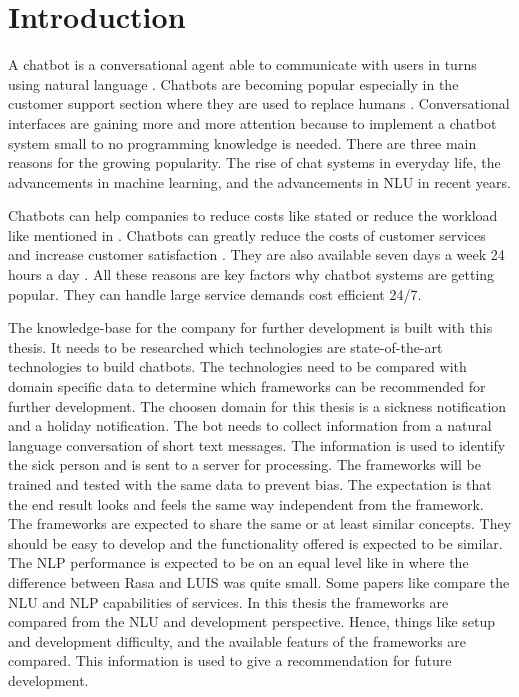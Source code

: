 
\section{Introduction} %
A chatbot is a conversational agent able to communicate with users in turns 
using natural language \cite{evaluateChatbotsShawar2007, shawar2007chatbots, huang2007extracting, gregori2017evaluation}.
Chatbots are becoming popular especially in the customer support section where they are used to replace humans \cite{GO2019304}.
Conversational interfaces are gaining more and more attention because to implement a chatbot system small 
to no programming knowledge is needed. \cite{braunEvaluatingNLU}
There are three main reasons for the growing popularity.
The rise of chat systems in everyday life, the advancements in machine learning, and the 
advancements in NLU in recent years. \cite{braunEvaluatingNLU}

Chatbots can help companies to reduce costs like \citet{rahman2017programming} stated
or reduce the workload like mentioned in \citet{deshpande2017survey}.
Chatbots can greatly reduce the costs of customer services and increase customer satisfaction \cite{singhbuilding}. 
They are also available seven days a week 24 hours a day \cite{singhbuilding}.
All these reasons are key factors why chatbot systems are getting popular.
They can handle large service demands cost efficient 24/7.

The knowledge-base for the company for further development is built with this thesis.
It needs to be researched which technologies are state-of-the-art technologies to build chatbots.
The technologies need to be compared with domain specific data to determine which frameworks can be 
recommended for further development.
The choosen domain for this thesis is a sickness notification and a holiday notification.
The bot needs to collect information from a natural language conversation of short text messages.
The information is used to identify the sick person and is sent to a server for processing.
The frameworks will be trained and tested with the same data to prevent bias.
The expectation is that the end result looks and feels the same way independent from the framework.
The frameworks are expected to share the same or at least similar concepts.
They should be easy to develop and the functionality offered is expected to be similar.
The NLP performance is expected to be on an equal level like in \citet{braunEvaluatingNLU} where the difference 
between Rasa and LUIS was quite small.
Some papers like \citet{braunEvaluatingNLU} compare the NLU and NLP capabilities of services.
In this thesis the frameworks are compared from the NLU and development perspective.
Hence, things like setup and development difficulty, and 
the available featurs of the frameworks are compared.
This information is used to give a recommendation for future development.


